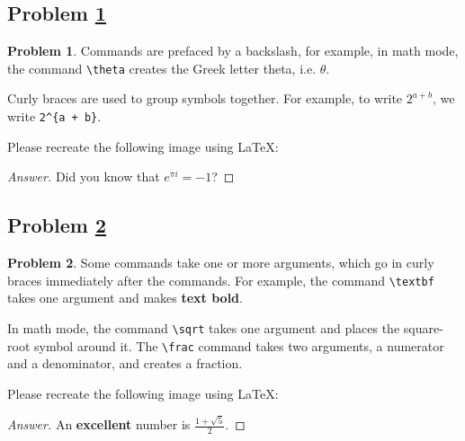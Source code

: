 \documentclass[11pt]{article}
\theoremstyle{definition}
\theoremstyle{definition}
\newtheorem{required}{Problem}
\theoremstyle{definition}
\begin{document}
\newpage
\subsection{Problem \ref{Latex2}} 
\begin{required} \label{Latex2}
Commands are prefaced by a backslash, for example, in math mode, the command \texttt{\textbackslash theta} creates the Greek letter theta, i.e. $\theta$.

Curly braces are used to group symbols together. For example, to write $2^{a + b}$, we write \texttt{2\^{}\{a + b\}}.

Please recreate the following image using \LaTeX:

\end{required}

\begin{proof}[Answer]
Did you know that $e^{\pi i} = -1$?
\end{proof}



\newpage
\subsection{Problem \ref{Latex3}}
\begin{required} \label{Latex3}
Some commands take one or more arguments, which go in curly braces immediately after the commands. For example, the command \texttt{\textbackslash textbf} takes one argument and makes \textbf{text bold}.

In math mode, the command \texttt{\textbackslash sqrt} takes one argument and places the square-root symbol around it. The \texttt{\textbackslash frac} command takes two arguments, a numerator and a denominator, and creates a fraction.

Please recreate the following image using \LaTeX:

\end{required}

\begin{proof}[Answer]
An \textbf{excellent} number is $\frac{1 + \sqrt{5}}{2}$.
\end{proof}
\end{document}
